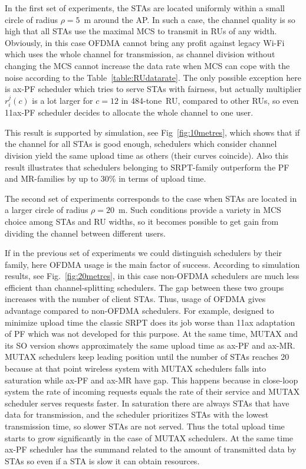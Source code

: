In the first set of experiments, the STAs are located uniformly within a small circle of radius $\rho = 5$~m around the AP.
In such a case, the channel quality is so high that all STAs use the maximal MCS to transmit in RUs of any width.
Obviously, in this case OFDMA cannot bring any profit against legacy Wi-Fi which uses the whole channel for transmission, as channel division without changing the MCS cannot increase the data rate when MCS can cope with the noise according to the Table~\ref{table:RUdatarate}.
The only possible exception here is ax-PF scheduler which tries to serve STAs with fairness, but actually multiplier $r^j_i (c)$ is a lot larger for $c=12$ in 484-tone~RU, compared to other RUs, so even 11ax-PF scheduler decides to allocate the whole channel to one user.

This result is supported by simulation, see Fig~\ref{fig:10metres}, which shows that if the channel for all STAs is good enough, schedulers which consider channel division yield the same upload time as others (their curves coincide).
Also this result illustrates that schedulers belonging to SRPT-family outperform the PF and MR-families by up to 30\% in terms of upload time. 

The second set of experiments corresponds to the case when STAs are located in a larger circle of radius $\rho = 20$~m.
Such conditions provide a variety in MCS choice among STAs and RU widths, so it becomes possible to get gain from dividing the channel between different users.

If in the previous set of experiments we could distinguish schedulers by their family, here OFDMA usage is the main factor of success.
According to simulation results, see Fig.~\ref{fig:20metres}, in this case non-OFDMA schedulers are much less efficient than channel-splitting schedulers. 
The gap between these two groups increases with the number of client STAs. 
Thus, usage of OFDMA gives advantage compared to non-OFDMA schedulers. 
For example, designed to minimize upload time the classic SRPT does its job worse than 11ax adaptation of PF which was not developed for this purpose.
At the same time, MUTAX and its SO version shows approximately the same upload time as ax-PF and ax-MR.
MUTAX schedulers keep leading position until the number of STAs reaches 20 because at that point wireless system with MUTAX schedulers falls into saturation while ax-PF and ax-MR have gap.
This happens because in close-loop system the rate of incoming requests equals the rate of their service and MUTAX scheduler serves requests faster.
In saturation there are always STAs that have data for transmission, and the scheduler prioritizes STAs with the lowest transmission time, so slower STAs are not served.
Thus the total upload time starts to grow significantly in the case of MUTAX schedulers.
At the same time ax-PF scheduler has the summand related to the amount of transmitted data by STAs so even if a STA is slow it can obtain resources.     

